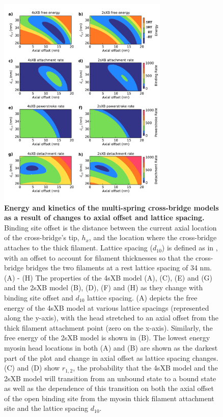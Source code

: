 \documentclass[]{article}
\begin{document}
\begin{figure}[ht]
    \begin{center}
    \includegraphics[width=3.2in]{../imgs/Figure2.pdf}
    \caption{
        \label{fig_kinetics_contours}
        \textbf{Energy and kinetics of the multi-spring cross-bridge models as a result of changes to axial offset and lattice spacing.} 
        Binding site offset is the distance between the current axial location of the cross-bridge's tip, $h_x$, and the location where the cross-bridge attaches to the thick filament.  
        Lattice spacing ($d_{10}$) is defined as in \citet{Millman1998}, with an offset to account for filament thicknesses so that the cross-bridge bridges the two filaments at a rest lattice spacing of 34 nm. 
        (A) - (H)  The properties of the 4sXB model (A), (C), (E) and (G) and the 2sXB model (B), (D), (F) and (H) as they change with binding site offset and $d_{10}$ lattice spacing.
        (A) depicts the free energy of the 4sXB model at various lattice spacings (represented along the y-axis), with the head stretched to an axial offset from the thick filament attachment point (zero on the x-axis).
        Similarly, the free energy of the 2sXB model is shown in (B).  The lowest energy myosin head locations in both (A) and (B) are shown as the darkest part of the plot and change in axial offset as lattice spacing changes.
        (C) and (D) show $r_{1,2}$, the probability that the 4sXB model and the 2sXB model will transition from an unbound state to a bound state as well as the dependence of this transition on both the axial offset of the open binding site from the myosin thick filament attachment site and the lattice spacing $d_{10}$. 
}
\end{center}
\end{figure}
\end{document}
